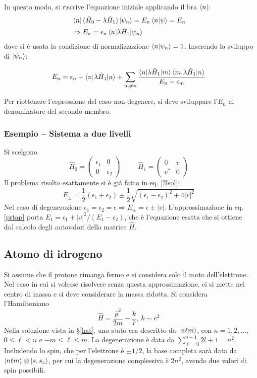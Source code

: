 \documentclass[11pt, a4paper]{scrartcl} %
\numberwithin{equation}{subsection}
\theoremstyle{style2}
\theoremstyle{style1}
\newenvironment{boxenv}[1][]{
    \begin{eqbox}[#1]
    }{
   \end{eqbox}
}
\begin{document}
In questo modo, si riscrive l'equazione iniziale applicando il bra $\bra{n} $:
\[
	\begin{split}
		&\bra{n} (\hat{H}_0 - \lambda \hat{H}_1) \ket{\psi _n} =  E_n\braket{n|\psi } = E_n\\
		&\Rightarrow E_n = \epsilon _n \braket{n|\lambda \hat{H}_1|\psi _n} 
	\end{split}
\] 
dove si \`e usata la condizione di normalizzazione $\braket{n|\psi _n} =1$. 
Inserendo lo sviluppo di $\ket{\psi _n} $:
\begin{boxenv}[]
	\begin{equation}\label{prtap}
	E_n = \epsilon _n + \braket{n|\lambda \hat{H}_1|n} + \sum_{m\neq n}^{} \frac{\braket{n|\lambda \hat{H}_1|m} \braket{m|\lambda \hat{H}_1|n} }{E_n - \epsilon _m}
\end{equation}
\end{boxenv}
Per riottenere l'espressione del caso non-degenere, si deve sviluppare l'$E_n$ al denominatore del secondo membro.
\subsubsection{Esempio -- Sistema a due livelli}
Si scelgono
\[
	\hat{H}_0 = \begin{pmatrix} \epsilon _1 & 0 \\ 0 & \epsilon _2 \end{pmatrix} \hspace{1cm}\hat{H}_1 = \begin{pmatrix} 0&v\\v^* & 0  \end{pmatrix} 
\] 
Il problema risolto esattamente si \`e gi\`a fatto in eq. \ref{2lsol}:
\[
E_\pm = \frac{1}{2}(\epsilon _1 + \epsilon _2) \pm \frac{1}{2}\sqrt{(\epsilon _1 - \epsilon _2)^2 + 4 \lvert v \rvert ^2} 
\] 
Nel caso di degenerazione $\epsilon _1 = \epsilon _2 = \epsilon \Rightarrow E_\pm = \epsilon  \pm \lvert v \rvert $.
L'approssimazione in eq. \ref{prtap} porta $E_1 = \epsilon _1 + \lvert v \rvert ^2 / (E_1 - \epsilon _2)$, che \`e l'equazione esatta che si ottiene dal calcolo degli autovalori della matrice $\hat{H}$.
\subsection{Atomo di idrogeno}
Si assume che il protone rimanga fermo e si considera solo il moto dell'elettrone. 
Nel caso in cui si volesse risolvere senza questa approssimazione, ci si mette nel centro di massa e si deve considerare la massa ridotta.
Si considera l'Hamiltoniano
\[
\hat{H} = \frac{\hat{p}^2 }{2m}- \frac{k}{\hat{r}}, \ k\sim e^2
\] 
Nella soluzione vista in \S\ref{hat}, uno stato era descritto da $\ket{n\ell m} $, con $n = 1 ,2 ,\ldots$, $0\le \ell <n$ e $-m\le \ell \le m$. 
La degenerazione \`e data da $\sum_{\ell =0}^{n-1} 2l+1 = n^2$.
Includendo lo spin, che per l'elettrone \`e $\pm 1 /2$, la base completa sar\`a data da $\ket{n\ell m} \otimes \ket{s,s_z} $, per cui la degenerazione complessiva \`e $2n^2$, avendo due valori di spin possibili.
\end{document}
